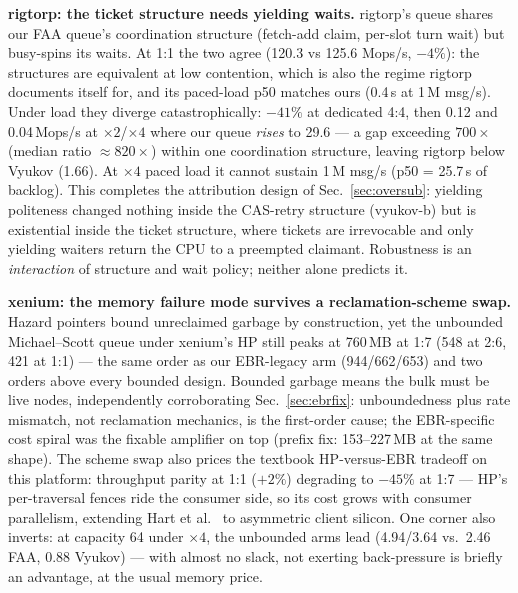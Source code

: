 \documentclass[conference]{IEEEtran}
\begin{document}
\textbf{rigtorp: the ticket structure needs yielding waits.}
rigtorp's queue shares our FAA queue's coordination structure (fetch-add
claim, per-slot turn wait) but busy-spins its waits. At 1:1 the two agree
(120.3 vs 125.6 Mops/s, $-4\%$): the structures are equivalent at low
contention, which is also the regime rigtorp documents itself for, and its
paced-load p50 matches ours (0.4\,\textmu s at 1\,M msg/s). Under load they
diverge catastrophically: $-41\%$ at dedicated 4:4, then 0.12 and 0.04\,Mops/s
at $\times2$/$\times4$ where our queue \emph{rises} to 29.6 --- a
gap exceeding $700\times$ (median ratio ${\approx}820\times$) within one coordination structure, leaving rigtorp
below Vyukov (1.66). At $\times4$ paced load it cannot sustain 1\,M msg/s
(p50 = 25.7\,s of backlog). This completes the attribution design of
Sec.~\ref{sec:oversub}: yielding politeness changed nothing inside the
CAS-retry structure (\textsf{vyukov-b}) but is existential inside the ticket
structure, where tickets are irrevocable and only yielding waiters return the
CPU to a preempted claimant. Robustness is an \emph{interaction} of structure
and wait policy; neither alone predicts it.

\textbf{xenium: the memory failure mode survives a reclamation-scheme swap.}
Hazard pointers bound unreclaimed garbage by construction, yet the unbounded
Michael--Scott queue under xenium's HP still peaks at 760\,MB at 1:7 (548 at
2:6, 421 at 1:1) --- the same order as our EBR-legacy arm (944/662/653) and
two orders above every bounded design. Bounded garbage means the bulk must be
live nodes, independently corroborating Sec.~\ref{sec:ebrfix}: unboundedness
plus rate mismatch, not reclamation mechanics, is the first-order cause; the
EBR-specific cost spiral was the fixable amplifier on top (prefix fix:
153--227\,MB at the same shape). The scheme swap also prices the textbook
HP-versus-EBR tradeoff on this platform: throughput parity at 1:1 ($+2\%$)
degrading to $-45\%$ at 1:7 --- HP's per-traversal fences ride the consumer
side, so its cost grows with consumer parallelism, extending Hart et
al.~\cite{hart2007} to asymmetric client silicon. One corner also inverts:
at capacity 64 under $\times4$, the unbounded arms lead (4.94/3.64 vs.\ 2.46
FAA, 0.88 Vyukov) --- with almost no slack, not exerting back-pressure is
briefly an advantage, at the usual memory price.
\end{document}

